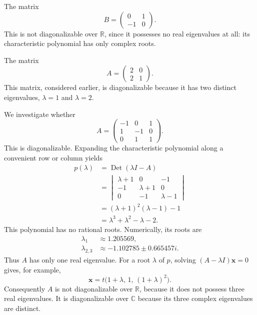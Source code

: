 \begin{example}
The matrix
\[
B = \begin{pmatrix} 0 & 1 \\ -1 & 0
\end{pmatrix}.
\]
This is not diagonalizable over $\mathbb{R}$, since it possesses no real eigenvalues at all: its characteristic polynomial has only complex roots.
\end{example}

\begin{example}
The matrix
\[
A = \begin{pmatrix} 2 & 0 \\ 2 & 1
\end{pmatrix}.
\]
This matrix, considered earlier, is diagonalizable because it has two distinct eigenvalues, $\lambda = 1$ and $\lambda = 2$.
\end{example}

\begin{example}
We investigate whether
\[
A = \begin{pmatrix} -1 & 0 & 1 \\ 1 & -1 & 0 \\ 0 & 1 & 1
\end{pmatrix}.
\]
This is diagonalizable. Expanding the characteristic polynomial along a convenient row or column yields
\[
\begin{aligned}
p(\lambda)&=\operatorname{Det}(\lambda I-A)\\
&=\begin{vmatrix}
\lambda+1&0&-1\\
-1&\lambda+1&0\\
0&-1&\lambda-1
\end{vmatrix}\\
&=(\lambda+1)^2(\lambda-1)-1\\
&=\lambda^3+\lambda^2-\lambda-2.
\end{aligned}
\]
This polynomial has no rational roots. Numerically, its roots are
\[
\begin{aligned}
\lambda_1&\approx1.205569,\\
\lambda_{2,3}&\approx-1.102785\pm0.665457i.
\end{aligned}
\]
Thus $A$ has only one real eigenvalue. For a root $\lambda$ of
$p$, solving $(A-\lambda I)\mathbf{x}=0$ gives, for example,
\[
\mathbf{x}=t\bigl(1+\lambda,\,1,\,(1+\lambda)^2\bigr).
\]
Consequently $A$ is not diagonalizable over $\mathbb{R}$, because it
does not possess three real eigenvalues. It is diagonalizable over
$\mathbb{C}$ because its three complex eigenvalues are distinct.
\end{example}

